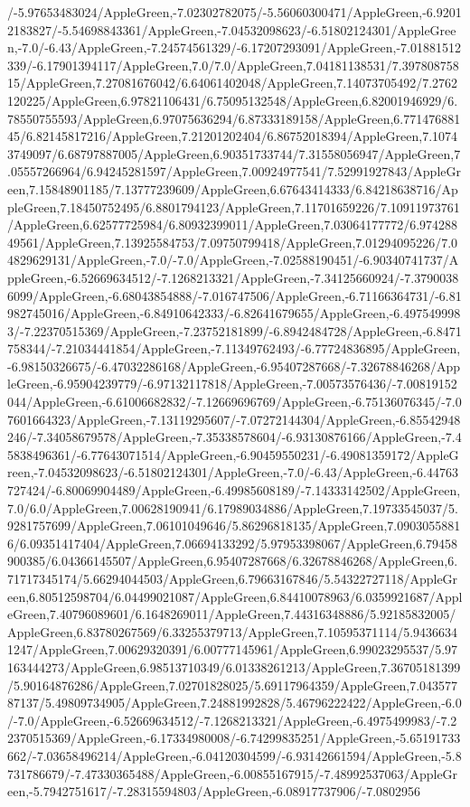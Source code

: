{\begin{tikzternal}
/-5.97653483024/AppleGreen,-7.02302782075/-5.56060300471/AppleGreen,-6.92012183827/-5.54698843361/AppleGreen,-7.04532098623/-6.51802124301/AppleGreen,-7.0/-6.43/AppleGreen,-7.24574561329/-6.17207293091/AppleGreen,-7.01881512339/-6.17901394117/AppleGreen,7.0/7.0/AppleGreen,7.04181138531/7.39780875815/AppleGreen,7.27081676042/6.64061402048/AppleGreen,7.14073705492/7.2762120225/AppleGreen,6.97821106431/6.75095132548/AppleGreen,6.82001946929/6.78550755593/AppleGreen,6.97075636294/6.87333189158/AppleGreen,6.77147688145/6.82145817216/AppleGreen,7.21201202404/6.86752018394/AppleGreen,7.10743749097/6.68797887005/AppleGreen,6.90351733744/7.31558056947/AppleGreen,7.05557266964/6.94245281597/AppleGreen,7.00924977541/7.52991927843/AppleGreen,7.15848901185/7.13777239609/AppleGreen,6.67643414333/6.84218638716/AppleGreen,7.18450752495/6.8801794123/AppleGreen,7.11701659226/7.10911973761/AppleGreen,6.62577725984/6.80932399011/AppleGreen,7.03064177772/6.97428849561/AppleGreen,7.13925584753/7.09750799418/AppleGreen,7.01294095226/7.04829629131/AppleGreen,-7.0/-7.0/AppleGreen,-7.02588190451/-6.90340741737/AppleGreen,-6.52669634512/-7.1268213321/AppleGreen,-7.34125660924/-7.37900386099/AppleGreen,-6.68043854888/-7.016747506/AppleGreen,-6.71166364731/-6.81982745016/AppleGreen,-6.84910642333/-6.82641679655/AppleGreen,-6.4975499983/-7.22370515369/AppleGreen,-7.23752181899/-6.8942484728/AppleGreen,-6.8471758344/-7.21034441854/AppleGreen,-7.11349762493/-6.77724836895/AppleGreen,-6.98150326675/-6.47032286168/AppleGreen,-6.95407287668/-7.32678846268/AppleGreen,-6.95904239779/-6.97132117818/AppleGreen,-7.00573576436/-7.00819152044/AppleGreen,-6.61006682832/-7.12669696769/AppleGreen,-6.75136076345/-7.07601664323/AppleGreen,-7.13119295607/-7.07272144304/AppleGreen,-6.85542948246/-7.34058679578/AppleGreen,-7.35338578604/-6.93130876166/AppleGreen,-7.45838496361/-6.77643071514/AppleGreen,-6.90459550231/-6.49081359172/AppleGreen,-7.04532098623/-6.51802124301/AppleGreen,-7.0/-6.43/AppleGreen,-6.44763727424/-6.80069904489/AppleGreen,-6.49985608189/-7.14333142502/AppleGreen,7.0/6.0/AppleGreen,7.00628190941/6.17989034886/AppleGreen,7.19733545037/5.9281757699/AppleGreen,7.06101049646/5.86296818135/AppleGreen,7.09030558816/6.09351417404/AppleGreen,7.06694133292/5.97953398067/AppleGreen,6.79458900385/6.04366145507/AppleGreen,6.95407287668/6.32678846268/AppleGreen,6.71717345174/5.66294044503/AppleGreen,6.79663167846/5.54322727118/AppleGreen,6.80512598704/6.04499021087/AppleGreen,6.84410078963/6.0359921687/AppleGreen,7.40796089601/6.1648269011/AppleGreen,7.44316348886/5.92185832005/AppleGreen,6.83780267569/6.33255379713/AppleGreen,7.10595371114/5.94366341247/AppleGreen,7.00629320391/6.00777145961/AppleGreen,6.99023295537/5.97163444273/AppleGreen,6.98513710349/6.01338261213/AppleGreen,7.36705181399/5.90164876286/AppleGreen,7.02701828025/5.69117964359/AppleGreen,7.04357787137/5.49809734905/AppleGreen,7.24881992828/5.46796222422/AppleGreen,-6.0/-7.0/AppleGreen,-6.52669634512/-7.1268213321/AppleGreen,-6.4975499983/-7.22370515369/AppleGreen,-6.17334980008/-6.74299835251/AppleGreen,-5.65191733662/-7.03658496214/AppleGreen,-6.04120304599/-6.93142661594/AppleGreen,-5.8731786679/-7.47330365488/AppleGreen,-6.00855167915/-7.48992537063/AppleGreen,-5.7942751617/-7.28315594803/AppleGreen,-6.08917737906/-7.0802956
\end{tikzternal}}
